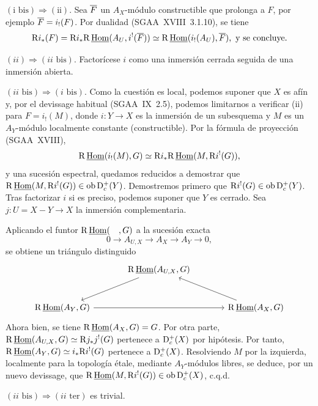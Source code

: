 $(\text{i~bis}) \Rightarrow (\text{ii})$. Sea $\overline{F}$ un $A_X$-módulo constructible que prolonga a $F$, por ejemplo $\overline{F} = i_{!}(F)$. Por dualidad (SGAA~XVIII~3.1.10), se tiene
\[
\mathrm{R} i_{*}(F) = \mathrm{R} i_{*} \mathrm{R}\,\underline{\operatorname{Hom}}(A_U, i^{!}(\overline{F})) \simeq \mathrm{R}\,\underline{\operatorname{Hom}}(i_{!}(A_U), \overline{F}), \text{ y se concluye.}
\]

$(ii) \Rightarrow (ii\text{~bis})$. Factorícese $i$ como una inmersión cerrada seguida de una inmersión abierta.

$(ii\text{~bis}) \Rightarrow (i\text{~bis})$. Como la cuestión es local, podemos suponer que $X$ es afín y, por el devissage habitual (SGAA~IX~2.5), podemos limitarnos a verificar (ii) para $F = i_{!}(M)$, donde $i : Y \to X$ es la inmersión de un subesquema y $M$ es un $A_Y$-módulo localmente constante (constructible). Por la fórmula de proyección (SGAA~XVIII),
\[
\mathrm{R}\,\underline{\operatorname{Hom}}(i_{!}(M), G) \simeq \mathrm{R} i_{*} \mathrm{R}\,\underline{\operatorname{Hom}}(M, \mathrm{R} i^{!}(G)),
\]
y una sucesión espectral, quedamos reducidos a demostrar que $\mathrm{R}\,\underline{\operatorname{Hom}}(M, \mathrm{R} i^{!}(G)) \in \operatorname{ob} \mathrm{D}_c^{+}(Y)$. Demostremos primero que $\mathrm{R} i^{!}(G) \in \operatorname{ob} \mathrm{D}_c^{+}(Y)$. Tras factorizar $i$ si es preciso, podemos suponer que $Y$ es cerrado. Sea $j : U = X - Y \to X$ la inmersión complementaria.

Aplicando el funtor $\mathrm{R}\,\underline{\operatorname{Hom}}(\quad, G)$ a la sucesión exacta
\[
0 \longrightarrow A_{U,X} \longrightarrow A_X \longrightarrow A_Y \longrightarrow 0,
\]
se obtiene un triángulo distinguido
\[
\begin{tikzcd}[column sep=large,row sep=large]
& \R\,\underline{\Hom}(A_{U,X}, G) \arrow[dl] & \\
\R\,\underline{\Hom}(A_Y, G) \arrow[rr] & & \R\,\underline{\Hom}(A_X, G) \arrow[ul]
\end{tikzcd}
\]
Ahora bien, se tiene $\mathrm{R}\,\underline{\operatorname{Hom}}(A_X, G) = G$. Por otra parte, $\mathrm{R}\,\underline{\operatorname{Hom}}(A_{U,X}, G) \simeq \mathrm{R} j_{*} j^{!}(G)$ pertenece a $\mathrm{D}_c^{+}(X)$ por hipótesis. Por tanto, $\mathrm{R}\,\underline{\operatorname{Hom}}(A_Y, G) \simeq i_{*} \mathrm{R} i^{!}(G)$ pertenece a $\mathrm{D}_c^{+}(X)$. Resolviendo $M$ por la izquierda, localmente para la topología étale, mediante $A_Y$-módulos libres, se deduce, por un nuevo devissage, que $\mathrm{R}\,\underline{\operatorname{Hom}}(M, \mathrm{R} i^{!}(G)) \in \operatorname{ob} \mathrm{D}_c^{+}(X)$, c.q.d.

$(ii\text{~bis}) \Rightarrow (ii\text{~ter})$ es trivial.

